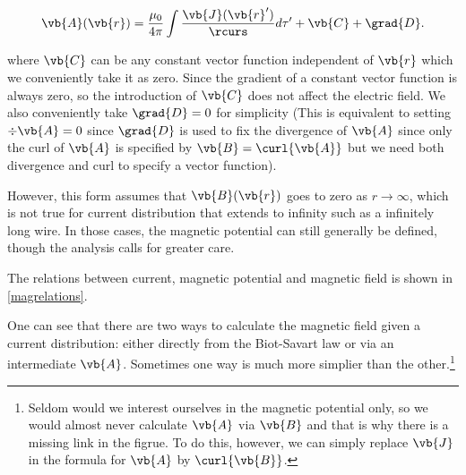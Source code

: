 \documentclass[english,a4paper,12pt]{report}
\begin{document}
\begin{equation}
    \vb{A} (\vb{r} ) = \frac{\mu_0}{4\pi} \int \frac{\vb{J} (\vb{r} ')}{\rcurs }d\tau ' + \vb{C} + \grad{D} . \label{magpotential} 
\end{equation}

where \(\vb{C} \) can be any constant vector function independent of \(\vb{r} \)  which we conveniently take it as zero. Since the gradient of a constant vector function is always zero, so the introduction of \(\vb{C} \) does not affect the electric field. We also conveniently take \(\grad{D} = 0\) for simplicity (This is equivalent to setting \(\div{\vb{A} } = 0 \) since \(\grad{D} \) is used to fix the divergence of \(\vb{A} \) since only the curl of \(\vb{A} \) is specified by \(\vb{B} = \curl{\vb{A} } \) but we need both divergence and curl to specify a vector function).  

However, this form assumes that \(\vb{B} (\vb{r} )\) goes to zero as \(r \to \infty\), which is not true for current distribution that extends to infinity such as a infinitely long wire. In those cases, the magnetic potential can still generally be defined, though the analysis calls for greater care.  

The relations between current, magnetic potential and magnetic field is shown in \cref{magrelations}. 


One can see that there are two ways to calculate the magnetic field given a current distribution: either directly from the Biot-Savart law or via an intermediate \(\vb{A} \). Sometimes one way is much more simplier than the other.\footnote{Seldom would we interest ourselves in the magnetic potential only, so we would almost never calculate \(\vb{A} \) via \(\vb{B} \) and that is why there is a missing link in the figrue. To do this, however, we can simply replace \(\vb{J} \) in the formula for \(\vb{A} \) by \(\curl{\vb{B} } \).} 
\end{document}
